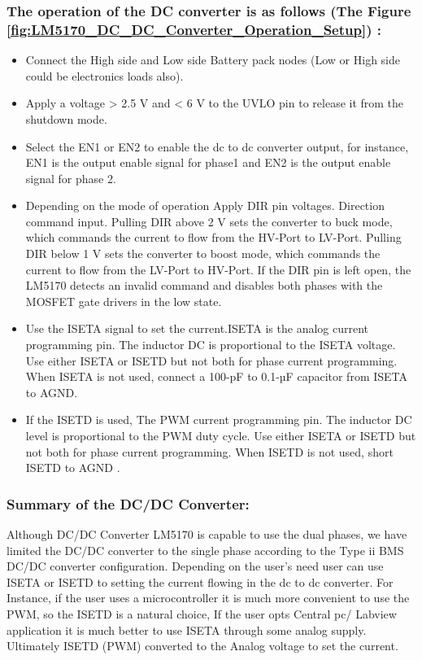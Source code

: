 \subsubsection{The operation of the DC converter is as follows (The Figure \ref{fig:LM5170_DC_DC_Converter_Operation_Setup}) :}
\begin{itemize}
    \item Connect the High side and Low side Battery pack nodes (Low or High side could be electronics loads also).
    \item Apply a voltage > 2.5 V and < 6 V  to the UVLO pin to release it from the shutdown mode.
    \item Select the EN1 or EN2 to enable the dc to dc converter output, for instance, EN1 is the output enable signal for phase1 and EN2 is the output enable signal for phase 2.
    \item Depending on the mode of operation Apply DIR pin voltages. Direction command input. Pulling DIR above 2 V sets the converter to buck mode, which commands the current to flow from the HV-Port to LV-Port. Pulling DIR below 1 V sets the converter to boost mode, which commands the current to flow from the LV-Port to HV-Port. If the DIR pin is left open, the LM5170 detects an invalid command and disables both phases with the MOSFET gate drivers in the low state\cite[p .5]{TI_LM5170_EVM_User_Guide}. 
    \item Use the ISETA signal to set the current.ISETA is the analog current programming pin. The inductor DC is proportional to the ISETA voltage. Use either ISETA or ISETD but not both for phase current programming. When ISETA is not used, connect a 100-pF to 0.1-µF capacitor from ISETA to AGND\cite[p .5]{TI_LM5170_EVM_User_Guide}.
    \item If the ISETD is used, The PWM current programming pin. The inductor DC level is proportional to the PWM duty cycle. Use either ISETA or ISETD but not both for phase current programming. When ISETD is not used, short ISETD to AGND \cite[p .6]{TI_LM5170_EVM_User_Guide}.
\end{itemize}
\subsubsection{Summary of the DC/DC Converter:}
\indent Although DC/DC Converter LM5170 is capable to use the dual phases, we have limited the DC/DC converter to the single phase according to the Type ii BMS DC/DC converter configuration. Depending on the user's need user can use ISETA or ISETD to setting the current flowing in the dc to dc converter. For Instance, if the user uses a microcontroller it is much more convenient to use the PWM, so the ISETD is a natural choice, If the user opts Central pc/ Labview application it is much better to use ISETA through some analog supply. Ultimately ISETD (PWM) converted to the Analog voltage to set the current.